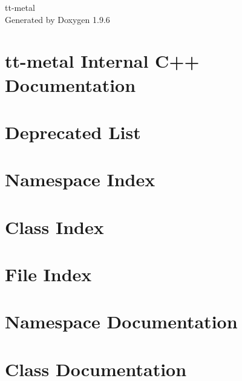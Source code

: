 \documentclass[twoside]{book}
\newcommand{\+}{\discretionary{\mbox{\scriptsize$\hookleftarrow$}}{}{}}
\newcommand{\clearemptydoublepage}{%
    \newpage{\pagestyle{empty}\cleardoublepage}%
  }
\begin{document}
  \raggedbottom
    \hypersetup{pageanchor=false,
                bookmarksnumbered=true,
                pdfencoding=unicode
               }
  \begin{titlepage}
  \vspace*{7cm}
  \begin{center}%
  {\Large tt-\/metal}\\
  \vspace*{1cm}
  {\large Generated by Doxygen 1.9.6}\\
  \end{center}
  \end{titlepage}
  \clearemptydoublepage
  \tableofcontents
  \clearemptydoublepage
  \hypersetup{pageanchor=true}
\chapter{tt-\/metal Internal C++ Documentation}
\label{index}\hypertarget{index}{}
\chapter{Deprecated List}
\label{deprecated}

\chapter{Namespace Index}

\chapter{Class Index}

\chapter{File Index}

\chapter{Namespace Documentation}







\chapter{Class Documentation}











\end{document}

